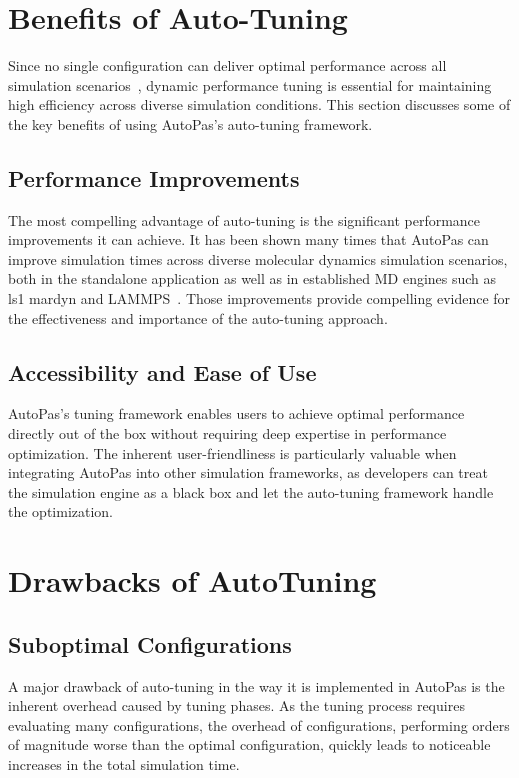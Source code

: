\documentclass[conference]{IEEEtran}
\begin{document}
\section{Benefits of Auto-Tuning}

Since no single configuration can deliver optimal performance across all simulation scenarios~\cite{Tchipev2020}, dynamic performance tuning is essential for maintaining high efficiency across diverse simulation conditions. This section discusses some of the key benefits of using AutoPas's auto-tuning framework.

\subsection*{Performance Improvements}

The most compelling advantage of auto-tuning is the significant performance improvements it can achieve. It has been shown many times that AutoPas can improve simulation times across diverse molecular dynamics simulation scenarios, both in the standalone application as well as in established MD engines such as ls1 mardyn and LAMMPS~\cite{SECKLER2021101296}\cite{Gratl2022AutoPas}. Those improvements provide compelling evidence for the effectiveness and importance of the auto-tuning approach.

\subsection*{Accessibility and Ease of Use}

AutoPas's tuning framework enables users to achieve optimal performance directly out of the box without requiring deep expertise in performance optimization. The inherent user-friendliness is particularly valuable when integrating AutoPas into other simulation frameworks, as developers can treat the simulation engine as a black box and let the auto-tuning framework handle the optimization.

\section{Drawbacks of AutoTuning}

\subsection*{Suboptimal Configurations}

A major drawback of auto-tuning in the way it is implemented in AutoPas is the inherent overhead caused by tuning phases. As the tuning process requires evaluating many configurations, the overhead of configurations, performing orders of magnitude worse than the optimal configuration, quickly leads to noticeable increases in the total simulation time.
\end{document}
